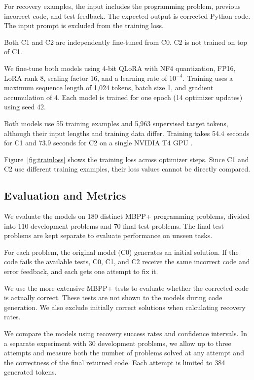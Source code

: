 \documentclass[10pt,twocolumn]{article}
\newcommand{\mbppplus}{MBPP+}
\begin{document}
For recovery examples, the input includes the programming
problem, previous incorrect code, and test feedback.
The expected output is corrected Python code.
The input prompt is excluded from the training loss.

Both C1 and C2 are independently fine-tuned from C0.
C2 is not trained on top of C1.



We fine-tune both models using 4-bit QLoRA with NF4 quantization, FP16, LoRA rank 8, scaling factor 16, and a learning rate of $10^{-4}$. Training uses a maximum sequence length of 1,024 tokens, batch size 1, and gradient accumulation of 4. Each model is trained for one epoch (14 optimizer updates) using seed 42.

Both models use 55 training examples and 5,963 supervised target tokens, although their input lengths and training data differ. Training takes 54.4 seconds for C1 and 73.9 seconds for C2 on a single NVIDIA T4 GPU \cite{lora,qlora}.

Figure~\ref{fig:trainloss} shows the training loss across optimizer steps. Since C1 and C2 use different training examples, their loss values cannot be directly compared.





\subsection{Evaluation and Metrics}

We evaluate the models on 180 distinct \mbppplus{} programming problems, divided into 110 development problems and 70 final test problems. The final test problems are kept separate to evaluate performance on unseen tasks.

For each problem, the original model (C0) generates an initial solution. If the code fails the available tests, C0, C1, and C2 receive the same incorrect code and error feedback, and each gets one attempt to fix it.

We use the more extensive \mbppplus{} tests to evaluate whether the corrected code is actually correct. These tests are not shown to the models during code generation. We also exclude initially correct solutions when calculating recovery rates.

We compare the models using recovery success rates and confidence intervals. In a separate experiment with 30 development problems, we allow up to three attempts and measure both the number of problems solved at any attempt and the correctness of the final returned code. Each attempt is limited to 384 generated tokens.
\end{document}
